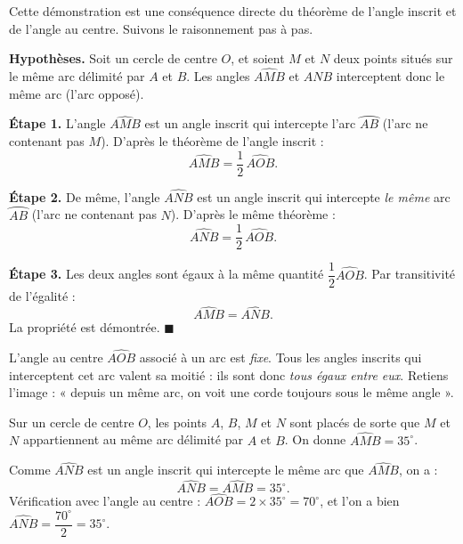 \documentclass[11pt]{article}
\begin{document}
\begin{experience}
Cette d\'emonstration est une cons\'equence directe du th\'eor\`eme de l'angle inscrit et de l'angle au centre. Suivons le raisonnement pas \`a pas.

\textbf{Hypoth\`eses.} Soit un cercle de centre $O$, et soient $M$ et $N$ deux points situ\'es sur le m\^eme arc d\'elimit\'e par $A$ et $B$. Les angles $\widehat{AMB}$ et $\widehat{ANB}$ interceptent donc le m\^eme arc (l'arc oppos\'e).

\textbf{\'Etape 1.} L'angle $\widehat{AMB}$ est un angle inscrit qui intercepte l'arc $\wideparen{AB}$ (l'arc ne contenant pas $M$). D'apr\`es le th\'eor\`eme de l'angle inscrit :
\[ \widehat{AMB} = \frac{1}{2}\,\widehat{AOB}. \]

\textbf{\'Etape 2.} De m\^eme, l'angle $\widehat{ANB}$ est un angle inscrit qui intercepte \emph{le m\^eme} arc $\wideparen{AB}$ (l'arc ne contenant pas $N$). D'apr\`es le m\^eme th\'eor\`eme :
\[ \widehat{ANB} = \frac{1}{2}\,\widehat{AOB}. \]

\textbf{\'Etape 3.} Les deux angles sont \'egaux \`a la m\^eme quantit\'e $\dfrac{1}{2}\widehat{AOB}$. Par transitivit\'e de l'\'egalit\'e :
\[ \widehat{AMB} = \widehat{ANB}. \]
La propri\'et\'e est d\'emontr\'ee. $\blacksquare$
\end{experience}

\begin{aretenir}[L'id\'ee \`a retenir]
L'angle au centre $\widehat{AOB}$ associ\'e \`a un arc est \emph{fixe}. Tous les angles inscrits qui interceptent cet arc valent sa moiti\'e : ils sont donc \emph{tous \'egaux entre eux}. Retiens l'image : « depuis un m\^eme arc, on voit une corde toujours sous le m\^eme angle ».
\end{aretenir}

\begin{exemplebox}
Sur un cercle de centre $O$, les points $A$, $B$, $M$ et $N$ sont plac\'es de sorte que $M$ et $N$ appartiennent au m\^eme arc d\'elimit\'e par $A$ et $B$. On donne $\widehat{AMB} = 35^\circ$.

Comme $\widehat{ANB}$ est un angle inscrit qui intercepte le m\^eme arc que $\widehat{AMB}$, on a :
\[ \widehat{ANB} = \widehat{AMB} = 35^\circ. \]
V\'erification avec l'angle au centre : $\widehat{AOB} = 2 \times 35^\circ = 70^\circ$, et l'on a bien $\widehat{ANB} = \dfrac{70^\circ}{2} = 35^\circ$.
\end{exemplebox}
\end{document}

